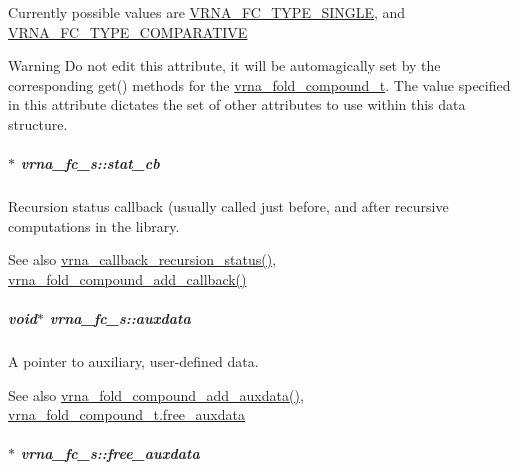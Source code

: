 Currently possible values are \hyperlink{group__fold__compound_gga01a4ff86fa71deaaa5d1abbd95a1447da7e264dd3cf2dc9b6448caabcb7763cd6}{V\+R\+N\+A\+\_\+\+F\+C\+\_\+\+T\+Y\+P\+E\+\_\+\+S\+I\+N\+G\+LE}, and \hyperlink{group__fold__compound_gga01a4ff86fa71deaaa5d1abbd95a1447dab821ce46ea3cf665be97df22a76f5023}{V\+R\+N\+A\+\_\+\+F\+C\+\_\+\+T\+Y\+P\+E\+\_\+\+C\+O\+M\+P\+A\+R\+A\+T\+I\+VE} \begin{DoxyWarning}{Warning}
Do not edit this attribute, it will be automagically set by the corresponding get() methods for the \hyperlink{group__fold__compound_ga1b0cef17fd40466cef5968eaeeff6166}{vrna\+\_\+fold\+\_\+compound\+\_\+t}. The value specified in this attribute dictates the set of other attributes to use within this data structure. 
\end{DoxyWarning}
\subparagraph[{\texorpdfstring{stat\+\_\+cb}{stat_cb}}]{$\ast$ vrna\+\_\+fc\+\_\+s\+::stat\+\_\+cb}\hypertarget{group__fold__compound_a87a83f6795b569000efcbe65acc3dd81}{}\label{group__fold__compound_a87a83f6795b569000efcbe65acc3dd81}


Recursion status callback (usually called just before, and after recursive computations in the library. 

\begin{DoxySeeAlso}{See also}
\hyperlink{group__fold__compound_ga4a4a0d838de6d18315bafc84f93f5cc0}{vrna\+\_\+callback\+\_\+recursion\+\_\+status()}, \hyperlink{group__fold__compound_ga097ed6133055624667cbce8cfdebf82d}{vrna\+\_\+fold\+\_\+compound\+\_\+add\+\_\+callback()} 
\end{DoxySeeAlso}
\subparagraph[{\texorpdfstring{auxdata}{auxdata}}]{\setlength{\rightskip}{0pt plus 5cm}void$\ast$ vrna\+\_\+fc\+\_\+s\+::auxdata}\hypertarget{group__fold__compound_a20048e0c369e9f24b55423d600037c68}{}\label{group__fold__compound_a20048e0c369e9f24b55423d600037c68}


A pointer to auxiliary, user-\/defined data. 

\begin{DoxySeeAlso}{See also}
\hyperlink{group__fold__compound_ga6316a9426bea2f742375e8df6febd3f6}{vrna\+\_\+fold\+\_\+compound\+\_\+add\+\_\+auxdata()}, \hyperlink{group__fold__compound_a8e84dbabab016ecd74da6c38cb94e816}{vrna\+\_\+fold\+\_\+compound\+\_\+t.\+free\+\_\+auxdata} 
\end{DoxySeeAlso}
\subparagraph[{\texorpdfstring{free\+\_\+auxdata}{free_auxdata}}]{$\ast$ vrna\+\_\+fc\+\_\+s\+::free\+\_\+auxdata}\hypertarget{group__fold__compound_a8e84dbabab016ecd74da6c38cb94e816}{}\label{group__fold__compound_a8e84dbabab016ecd74da6c38cb94e816}


